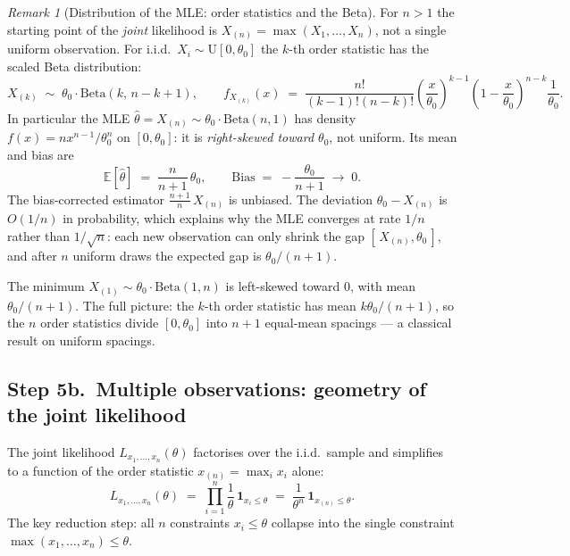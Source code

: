 \documentclass[a4paper,oneside,12pt]{extarticle}
\theoremstyle{plain}
\theoremstyle{definition}
\theoremstyle{remark}
\newtheorem{remark}[proposition]{Remark}
\begin{document}
\begin{remark}[Distribution of the MLE: order statistics and the Beta]
For $n > 1$ the starting point of the \emph{joint} likelihood is
$X_{(n)} = \max(X_1,\ldots,X_n)$, not a single uniform observation.
For i.i.d.\ $X_i \sim \mathrm{U}[0,\theta_0]$ the $k$-th order
statistic has the scaled Beta distribution:
\[
  X_{(k)} \;\sim\; \theta_0 \cdot \mathrm{Beta}(k,\, n-k+1),
  \qquad
  f_{X_{(k)}}(x) \;=\; \frac{n!}{(k-1)!(n-k)!}
  \left(\frac{x}{\theta_0}\right)^{k-1}
  \left(1-\frac{x}{\theta_0}\right)^{n-k}
  \frac{1}{\theta_0}.
\]
In particular the MLE $\hat\theta = X_{(n)} \sim \theta_0\cdot\mathrm{Beta}(n,1)$
has density $f(x)= n x^{n-1}/\theta_0^n$ on $[0,\theta_0]$: it is
\emph{right-skewed toward $\theta_0$}, not uniform.  Its mean and
bias are
\[
  \mathbb{E}[\hat\theta] \;=\; \frac{n}{n+1}\,\theta_0,
  \qquad
  \mathrm{Bias} \;=\; -\frac{\theta_0}{n+1} \;\to\; 0.
\]
The bias-corrected estimator $\frac{n+1}{n}\,X_{(n)}$ is unbiased.
The deviation $\theta_0 - X_{(n)}$ is $O(1/n)$ in probability,
which explains why the MLE converges at rate $1/n$ rather than
$1/\sqrt{n}$: each new observation can only shrink the gap
$[\,X_{(n)},\theta_0\,]$, and after $n$ uniform draws the expected
gap is $\theta_0/(n+1)$.

The minimum $X_{(1)} \sim \theta_0\cdot\mathrm{Beta}(1,n)$ is
left-skewed toward $0$, with mean $\theta_0/(n+1)$.  The full
picture: the $k$-th order statistic has mean
$k\theta_0/(n+1)$, so the $n$ order statistics divide
$[0,\theta_0]$ into $n+1$ equal-mean spacings --- a classical
result on uniform spacings.
\end{remark}

\subsection{Step 5b.\ Multiple observations: geometry of the joint likelihood}
\label{sec:u0t_multi_geom}

The joint likelihood $L_{x_1,\ldots,x_n}(\theta)$ factorises over the
i.i.d.\ sample and simplifies to a function of the order statistic
$x_{(n)} = \max_i x_i$ alone:
\[
  L_{x_1,\ldots,x_n}(\theta)
  \;=\; \prod_{i=1}^n \frac{1}{\theta}\,\mathbf{1}_{x_i \le \theta}
  \;=\; \frac{1}{\theta^n}\,\mathbf{1}_{x_{(n)}\le\theta}.
\]
The key reduction step: all $n$ constraints $x_i \le \theta$ collapse
into the single constraint $\max(x_1,\ldots,x_n) \le \theta$.
\end{document}
